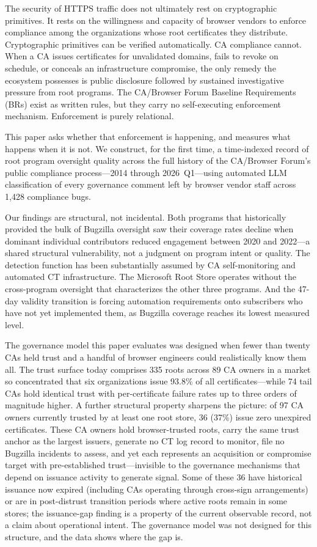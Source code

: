 \documentclass[10pt,twocolumn,letterpaper]{article}
\begin{document}
The security of HTTPS traffic does not ultimately rest on cryptographic
primitives. It rests on the willingness and capacity of browser vendors to
enforce compliance among the organizations whose root certificates they
distribute. Cryptographic primitives can be verified automatically. CA
compliance cannot. When a CA issues certificates for unvalidated domains,
fails to revoke on schedule, or conceals an infrastructure compromise, the
only remedy the ecosystem possesses is public disclosure followed by
sustained investigative pressure from root programs. The CA/Browser Forum
Baseline Requirements (BRs) exist as written rules, but they carry no
self-executing enforcement mechanism. Enforcement is purely relational.

This paper asks whether that enforcement is happening, and measures what
happens when it is not. We construct, for the first time, a time-indexed
record of root program oversight quality across the full history of the
CA/Browser Forum's public compliance process---2014 through 2026~Q1---using
automated LLM classification of every governance comment left by browser
vendor staff across 1,428 compliance bugs.

Our findings are structural, not incidental. Both programs that historically
provided the bulk of Bugzilla oversight saw their coverage rates decline
when dominant individual contributors reduced engagement between 2020 and
2022---a shared structural vulnerability, not a judgment on program intent
or quality. The detection function has been substantially assumed by CA
self-monitoring and automated CT infrastructure. The Microsoft Root Store
operates without the cross-program oversight that characterizes the other
three programs. And the 47-day validity transition is forcing automation
requirements onto subscribers who have not yet implemented them, as Bugzilla
coverage reaches its lowest measured level.

The governance model this paper evaluates was designed when fewer than
twenty CAs held trust and a handful of browser engineers could realistically
know them all. The trust surface today comprises 335 roots across 89 CA
owners in a market so concentrated that six organizations issue 93.8\% of
all certificates---while 74 tail CAs hold identical trust with per-certificate
failure rates up to three orders of magnitude higher. A further structural
property sharpens the picture: of 97 CA owners currently trusted by at
least one root store, 36 (37\%) issue zero unexpired certificates. These
CA owners hold browser-trusted roots, carry the same trust anchor as the
largest issuers, generate no CT log record to monitor, file no Bugzilla
incidents to assess, and yet each represents an acquisition or compromise
target with pre-established trust---invisible to the governance mechanisms
that depend on issuance activity to generate signal. Some of these 36
have historical issuance now expired (including CAs operating through
cross-sign arrangements) or are in post-distrust transition periods
where active roots remain in some stores; the issuance-gap finding is
a property of the current observable record, not a claim about
operational intent. The governance model
was not designed for this structure, and the data shows where the gap is.
\end{document}
